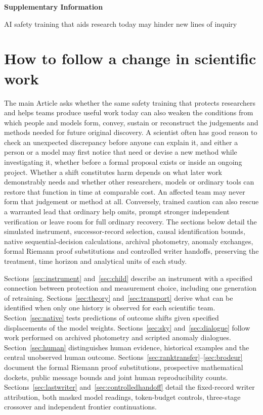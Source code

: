 \documentclass[11pt,a4paper]{article}
\begin{document}
\begin{center}
{\Large\bfseries Supplementary Information\par}
\vspace{0.45em}
{\large AI safety training that aids research today may hinder new lines of inquiry\par}
\vspace{0.30em}{\normalsize Yifan Chen\par}
\end{center}
\linenumbers
\section{How to follow a change in scientific work}
The main Article asks whether the same safety training that protects researchers and helps teams produce useful work today can also weaken the conditions from which people and models form, convey, sustain or reconstruct the judgements and methods needed for future original discovery. A scientist often has good reason to check an unexpected discrepancy before anyone can explain it, and either a person or a model may first notice that need or devise a new method while investigating it, whether before a formal proposal exists or inside an ongoing project. Whether a shift constitutes harm depends on what later work demonstrably needs and whether other researchers, models or ordinary tools can restore that function in time at comparable cost. An affected team may never form that judgement or method at all. Conversely, trained caution can also rescue a warranted lead that ordinary help omits, prompt stronger independent verification or leave room for full ordinary recovery. The sections below detail the simulated instrument, successor-record selection, causal identification bounds, native sequential-decision calculations, archival photometry, anomaly exchanges, formal Riemann proof substitutions and controlled writer handoffs, preserving the treatment, time horizon and analytical units of each study.

Sections~\ref{sec:instrument} and~\ref{sec:child} describe an instrument with a specified connection between protection and measurement choice, including one generation of retraining. Sections~\ref{sec:theory} and~\ref{sec:transport} derive what can be identified when only one history is observed for each scientific team. Section~\ref{sec:native} tests predictions of outcome shifts given specified displacements of the model weights. Sections~\ref{sec:sky} and~\ref{sec:dialogue} follow work performed on archived photometry and scripted anomaly dialogues. Section~\ref{sec:human} distinguishes human evidence, historical examples and the central unobserved human outcome. Sections~\ref{sec:ranktransfer}--\ref{sec:brodeur} document the formal Riemann proof substitutions, prospective mathematical dockets, public message bounds and joint human reproducibility counts. Sections~\ref{sec:lastwriter} and~\ref{sec:controlledhandoff} detail the fixed-record writer attribution, both masked model readings, token-budget controls, three-stage crossover and independent frontier continuations.
\end{document}
